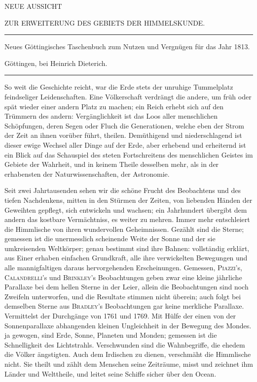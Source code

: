 \clearpage{}%
\begin{center}
{\small NEUE AUSSICHT\par
ZUR ERWEITERUNG DES GEBIETS DER HIMMELSKUNDE.\par}
\medskip\hrule\medskip
{\small Neues Göttingisches Taschenbuch zum Nutzen und Vergnügen für das Jahr 1813.\par
Göttingen, bei Heinrich Dieterich.\par}
\medskip\hrule
\end{center}\medskip
So weit die Geschichte reicht, war die Erde stets der unruhige Tummelplatz feindseliger Leidenschaften. Eine Völkerschaft verdrängt die andere, um früh oder spät wieder einer andern Platz zu machen; ein Reich erhebt sich auf den Trümmern des andern: Vergänglichkeit ist das Loos aller menschlichen Schöpfungen, deren Segen oder Fluch die Generationen, welche eben der Strom der Zeit an ihnen vorüber führt, theilen. Demüthigend und niederschlagend ist dieser ewige Wechsel aller Dinge auf der Erde, aber erhebend und erheiternd ist ein Blick auf das Schauspiel des steten Fortschreitens des menschlichen Geistes im Gebiete der Wahrheit, und in keinem Theile desselben mehr, als in der erhabensten der Naturwissenschaften, der Astronomie.

Seit zwei Jahrtausenden sehen wir die schöne Frucht des Beobachtens und des tiefen Nachdenkens, mitten in den Stürmen der Zeiten, von liebenden Händen der Geweihten gepflegt, sich entwickeln und wachsen; ein Jahrhundert übergibt dem andern das kostbare Vermächtniss, es weiter zu mehren. Immer mehr entschleiert die Himmlische von ihren wundervollen Geheimnissen. Gezählt sind die Sterne; gemessen ist die unermesslich scheinende Weite der Sonne und der sie umkreisenden Weltkörper; genau bestimmt sind ihre Bahnen: vollständig erklärt, aus Einer erhaben einfachen Grundkraft, alle ihre verwickelten Bewegungen und alle mannigfaltigen daraus hervorgehenden Erscheinungen. Gemessen,
\expandafter\def\csname HistoricalNoteText13\endcsname{\textsc{Piazzi}'s, \textsc{Calandrelli}'s und \textsc{Brinkley}'s Beobachtungen geben zwar eine kleine jährliche Parallaxe bei dem hellen Sterne in der Leier, allein die Beobachtungen sind noch Zweifeln unterworfen, und die Resultate stimmen nicht überein; auch folgt bei demselben Sterne aus \textsc{Bradley}'s Beobachtungen gar keine merkliche Parallaxe.}%
\expandafter\def\csname HistoricalNoteText14\endcsname{Vermittelst der Durchgänge von 1761 und 1769.}%
\expandafter\def\csname HistoricalNoteText15\endcsname{Mit Hülfe der einen von der Sonnenparallaxe abhangenden kleinen Ungleichheit in der Bewegung des Mondes.}%
%
ja gewogen, sind Erde, Sonne, Planeten und Monden; gemessen ist die Schnelligkeit des Lichtstrahls. Verschwunden sind die Wahnbegriffe, die ehedem die Völker ängstigten. Auch dem Irdischen zu dienen, verschmäht die Himmlische nicht. Sie theilt und zählt dem Menschen seine Zeiträume, misst und zeichnet ihm Länder und Welttheile, und leitet seine Schiffe sicher über den Ocean.

